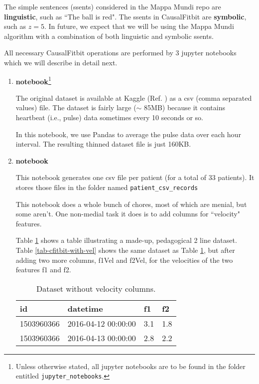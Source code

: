 \documentclass[12pt]{article}
\begin{document}
The simple sentences (ssents)
considered in the Mappa Mundi
repo are {\bf linguistic}, such as ``The ball is red". The ssents in 
CausalFitbit are {\bf symbolic},
such as $z=5$. In future,
we expect that we will be using 
the Mappa Mundi algorithm
with a combination of both
linguistic and symbolic ssents.

All necessary 
CausalFitbit 
operations are performed
by 3 jupyter notebooks
which we will describe in detail next.

\begin{enumerate}

\item {\bf {\color{red}{\tt heartrate\_data\_thinning.ipynb} } notebook}\footnote{Unless otherwise stated,
all jupyter  notebooks
are to be found in the folder entitled
{\tt jupyter\_notebooks}.}


The original dataset is available at  Kaggle (Ref. \cite{fitbit-dataset}) as a csv (comma separated values) file. The
dataset is fairly large ($\sim$ 85MB)
because it contains heartbeat (i.e., pulse) data sometimes every 10 seconds or so. 

In this notebook, we use Pandas to average the pulse data over each hour interval.  The resulting thinned dataset file
is just 160KB.  
 \item {\bf {\color{red}{\tt data\_preparation.ipynb}} notebook}


This notebook generates one 
 csv  file per patient (for a total of 33 patients). It
 stores those files in the folder named 
 {\tt patient\_csv\_records} 
 
 This notebook does a whole
 bunch of chores, most of which are  
 menial, but some aren't.
 One non-medial task it does is to add columns for ``velocity" features.
  
  
  Table \ref{tab-cfitbit-without-vel}
  shows a table illustrating a made-up, pedagogical 2 line dataset. Table \ref{tab-cfitbit-with-vel}
  shows the same
  dataset as Table \ref{tab-cfitbit-without-vel}, but after
  adding two more columns, f1Vel and f2Vel,
  for the velocities of the two features f1 and f2. 


\begin{table}[h!]
\centering
\begin{tabular}{|l|l|l|l|}
\hline
\rowcolor[HTML]{FFFFC7} 
id & datetime & f1 & f2 \\ \hline
1503960366 & 2016-04-12 00:00:00 & 3.1 & 1.8 \\ \hline
1503960366 & 2016-04-13 00:00:00 & 2.8 & 2.2 \\ \hline
\end{tabular}
\caption{Dataset without velocity columns.}
\label{tab-cfitbit-without-vel}
\end{table}



\end{enumerate}
\end{document}
